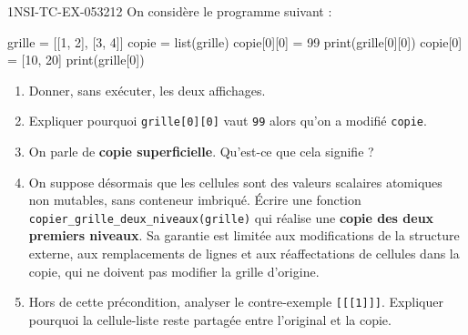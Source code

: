 \begin{exercice}{1NSI-TC-EX-053}{2}{12}
On considère le programme suivant :
\begin{python}
grille = [[1, 2], [3, 4]]
copie = list(grille)
copie[0][0] = 99
print(grille[0][0])
copie[0] = [10, 20]
print(grille[0])
\end{python}
\begin{enumerate}
  \item Donner, sans exécuter, les deux affichages.
  \item Expliquer pourquoi \lstinline{grille[0][0]} vaut \lstinline{99} alors qu'on
        a modifié \lstinline{copie}.
  \item On parle de \textbf{copie superficielle}. Qu'est-ce que cela signifie ?
  \item On suppose désormais que les cellules sont des valeurs scalaires atomiques
        non mutables, sans conteneur imbriqué. Écrire une fonction
        \lstinline{copier_grille_deux_niveaux(grille)} qui réalise une
        \textbf{copie des deux premiers niveaux}. Sa garantie est limitée aux
        modifications de la structure externe, aux remplacements de lignes et aux
        réaffectations de cellules dans la copie, qui ne doivent pas modifier la
        grille d'origine.
  \item Hors de cette précondition, analyser le contre-exemple
        \lstinline{[[[1]]]}. Expliquer pourquoi la cellule-liste reste partagée
        entre l'original et la copie.
\end{enumerate}
\end{exercice}
